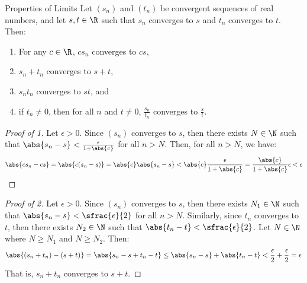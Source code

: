 \begin{thmbox}{Properties of Limits}{}
    Let $(s_n)$ and $(t_n)$ be convergent sequences of real numbers, and let $s,t \in \R$ such that $s_n$ converges to $s$ and $t_n$ converges to $t$. Then:
    \begin{enumerate}
        \item For any $c \in \R$, $cs_n$ converges to $cs$,
        \item $s_n + t_n$ converges to $s+t$,
        \item $s_nt_n$ converges to $st$, and
        \item if $t_n \neq 0$, then for all $n$ and $t \neq 0$, $\frac{s_n}{t_n}$ converges to $\frac{s}{t}$.
    \end{enumerate}
    \tcblower
    \begin{proof}[Proof of 1]
        Let $\epsilon > 0$. Since $(s_n)$ converges to $s$, then there exists $N \in \N$ such that $\abs{s_n - s} < \frac{\epsilon}{1 + \abs{c}}$ for all $n > N$. Then, for all $n > N$, we have:
        \[ \abs{cs_n - cs} = \abs{c(s_n-s)} = \abs{c}\abs{s_n-s} < \abs{c} \frac{\epsilon}{1+\abs{c}} = \frac{\abs{c}}{1+\abs{c}} \epsilon < \epsilon \]
    \end{proof}

    \begin{proof}[Proof of 2]
        Let $\epsilon > 0$. Since $(s_n)$ converges to $s$, then there exists $N_1 \in \N$ such that $\abs{s_n - s} < \sfrac{\epsilon}{2}$ for all $n > N$. Similarly, since $t_n$ converges to $t$, then there exists $N_2 \in \N$ such that $\abs{t_n - t} < \sfrac{\epsilon}{2}$. Let $N \in \N$ where $N \geq N_1$ and $N \geq N_2$. Then:
        \[ \abs{(s_n + t_n) - (s + t)} = \abs{s_n - s + t_n - t} \leq \abs{s_n - s} + \abs{t_n - t} < \frac{\epsilon}{2} + \frac{\epsilon}{2} = \epsilon \]
        That is, $s_n + t_n$ converges to $s + t$.
    \end{proof}


\end{thmbox}
